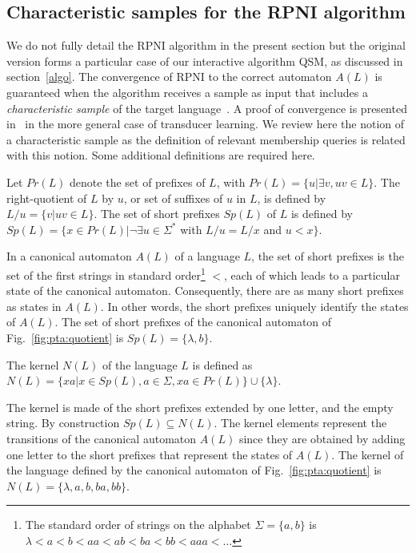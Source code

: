 \subsection{Characteristic samples for the RPNI algorithm\label{Characteristic}}

We do not fully detail the RPNI algorithm in the present section but the original version forms a particular case
of our interactive algorithm \textsc{QSM}, as discussed in section~\ref{algo}. The convergence of RPNI to the correct automaton $A(L)$ is guaranteed when the algorithm receives a sample as input that includes a \textsl{characteristic sample} of the target language~\cite{Oncina:1992}. A proof of convergence is presented in~\cite{Oncina:1993} in the more general case of transducer learning. We review here the notion of a characteristic sample as the definition of relevant membership queries is related with this notion. Some additional definitions are required here.

\begin{definition} 
Let $Pr(L)$ denote the set of prefixes of $L$, with $Pr(L) = \{u | \exists v, uv \in L\}$. The right-quotient of $L$ by $u$, or set of suffixes of $u$ in $L$, is defined by $L/u = \{v | uv \in L\}$. The set of short prefixes $Sp(L)$ of $L$ is defined by $Sp(L) = \{x \in Pr(L) | \neg\exists u \in \Sigma^*$ with $L/u = L/x$ and $u < x\}$.
\end{definition}

In a canonical automaton $A(L)$ of a language $L$, the set of short prefixes is the set of the first strings in standard order\footnote{The standard order of strings on the alphabet $\Sigma=\{a,b\}$ is $\lambda < a < b < aa < ab < ba < bb < aaa < \ldots$} $<$, each of which leads to a particular state of the canonical automaton. Consequently, there are as many short prefixes as states in $A(L)$. In other words, the short prefixes uniquely identify the states of $A(L)$. The set of short prefixes of the canonical automaton of Fig.~\ref{fig:pta:quotient} is $Sp(L) = \{\lambda, b\}$.

\begin{definition}
 The kernel $N(L)$ of the language $L$ is defined as $N(L) = \{xa | x \in Sp(L), a \in \Sigma, xa \in Pr(L)\} \cup \{\lambda\}$.
\end{definition}

The kernel is made of the short prefixes extended by one letter, and the empty string. By construction $Sp(L) \subseteq N(L)$. The kernel elements represent the transitions of the canonical automaton $A(L)$ since they are obtained by adding one letter to the short prefixes that represent the states of $A(L)$. The kernel of the language defined by the canonical automaton of Fig.~\ref{fig:pta:quotient} is $N(L) = \{\lambda, a, b, ba, bb\}$.

